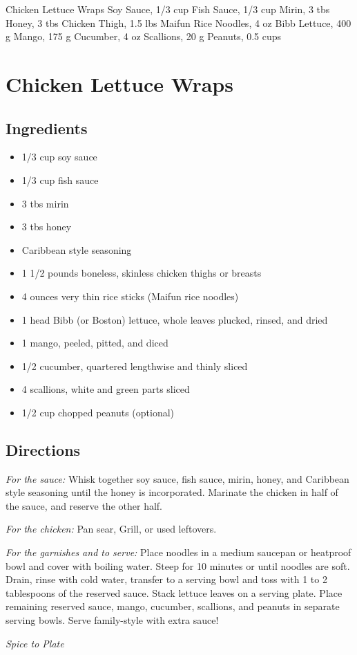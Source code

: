 Chicken Lettuce Wraps
  Soy Sauce, 1/3 cup
  Fish Sauce, 1/3 cup
  Mirin, 3 tbs
  Honey, 3 tbs
  Chicken Thigh, 1.5 lbs
  Maifun Rice Noodles, 4 oz
  Bibb Lettuce, 400 g
  Mango, 175 g
  Cucumber, 4 oz
  Scallions, 20 g
  Peanuts, 0.5 cups
\section{ Chicken Lettuce Wraps }

\subsection{ Ingredients }

\begin{itemize}
  \item 1/3 cup soy sauce
  \item 1/3 cup fish sauce
  \item 3 tbs mirin
  \item 3 tbs honey
  \item Caribbean style seasoning
  \item 1 1/2 pounds boneless, skinless chicken thighs or breasts
  \item 4 ounces very thin rice sticks (Maifun rice noodles)
  \item 1 head Bibb (or Boston) lettuce, whole leaves plucked, rinsed, and dried
  \item 1 mango, peeled, pitted, and diced
  \item 1/2 cucumber, quartered lengthwise and thinly sliced
  \item 4 scallions, white and green parts sliced
  \item 1/2 cup chopped peanuts (optional)
\end{itemize}

\subsection{ Directions }

  \textit{For the sauce:} Whisk together soy sauce, fish sauce, mirin, honey, and Caribbean style seasoning until the honey is incorporated. Marinate the chicken in half of the sauce, and reserve the other half. 

  \textit{For the chicken:} Pan sear, Grill, or used leftovers.

  \textit{For the garnishes and to serve:} Place noodles in a medium saucepan or heatproof bowl and cover with boiling water. Steep for 10 minutes or until noodles are soft. Drain, rinse with cold water, transfer to a serving bowl and toss with 1 to 2 tablespoons of the reserved sauce. Stack lettuce leaves on a serving plate. Place remaining reserved sauce, mango, cucumber, scallions, and peanuts in separate serving bowls. Serve family-style with extra sauce!

\textit{Spice to Plate}
